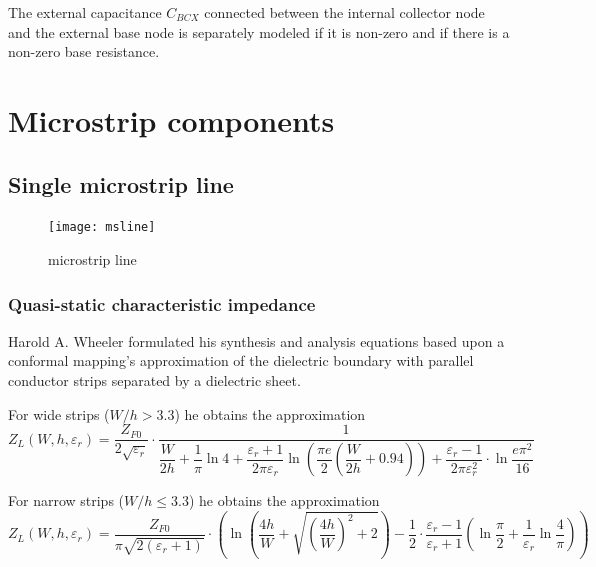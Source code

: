 \documentclass[10pt]{report}
\begin{document}
The external capacitance $C_{BCX}$ connected between the internal
collector node and the external base node is separately modeled if it
is non-zero and if there is a non-zero base resistance.

\chapter{Microstrip components}

\section{Single microstrip line}

\begin{figure}[ht]
\begin{center}
\texttt{[image: msline]}
\end{center}
\caption{microstrip line}
\label{fig:MSline}
\end{figure}
\FloatBarrier

\subsection{Quasi-static characteristic impedance}

Harold A. Wheeler \cite{Wheeler2} formulated his synthesis and
analysis equations based upon a conformal mapping's approximation of
the dielectric boundary with parallel conductor strips separated by a
dielectric sheet.

\addvspace{12pt}

For wide strips ($W/h > 3.3$) he obtains the approximation
\begin{equation}
Z_{L}\left(W, h, \varepsilon_{r}\right) =
\frac{Z_{F0}}{2\sqrt{\varepsilon_{r}}}\cdot\frac{1}{\dfrac{W}{2h} + \dfrac{1}{\pi}\ln{4} + \dfrac{\varepsilon_{r} + 1}{2\pi \varepsilon_{r}} \ln{\left(\dfrac{\pi e}{2}\left(\dfrac{W}{2h} + 0.94\right)\right)} + \dfrac{\varepsilon_{r} - 1}{2\pi \varepsilon_{r}^{2}}\cdot \ln{\dfrac{e\pi^{2}}{16}}}
\end{equation}

For narrow strips ($W/h \le 3.3$) he obtains the approximation
\begin{equation}
Z_{L}\left(W, h, \varepsilon_{r}\right) =
\frac{Z_{F0}}{\pi \sqrt{2 \left(\varepsilon_{r} + 1\right)}} \cdot \left(\ln{\left(\frac{4h}{W} + \sqrt{\left(\frac{4h}{W}\right)^{2} + 2}\right)} - \frac{1}{2}\cdot \frac{\varepsilon_{r} - 1}{\varepsilon_{r} + 1}\left(\ln{\frac{\pi}{2}} + \frac{1}{\varepsilon_{r}} \ln{\frac{4}{\pi}}\right)\right)
\end{equation}
\end{document}
